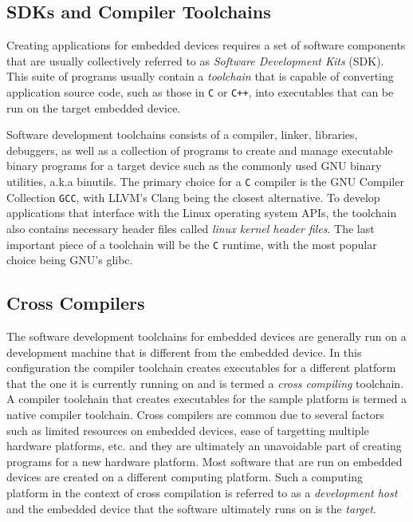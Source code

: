 
\subsection{SDKs and Compiler Toolchains}

Creating applications for embedded devices requires a set of software components that are usually collectively referred to as \textit{Software Development Kits} (SDK). This suite of programs usually contain a \textit{toolchain} that is capable of converting application source code, such as those in \texttt{C}  or \texttt{C++}, into executables that can be run on the target embedded device.

Software development toolchains consists of a compiler, linker, libraries, debuggers, as well as a collection of programs to create and manage executable binary programs for a target device such as the commonly used GNU binary utilities, a.k.a binutils. The primary choice for a \texttt{C} compiler is the GNU Compiler Collection \texttt{GCC}, with LLVM's Clang being the closest alternative. To develop applications that interface with the Linux operating system APIs, the toolchain also contains necessary header files called \textit{linux kernel header files}. The last important piece of a toolchain will be the \texttt{C} runtime, with the most popular choice being GNU's glibc.


\subsection{Cross Compilers}

The software development toolchains for embedded devices are generally run on a development machine that is different from the embedded device. In this configuration the compiler toolchain creates executables for a different platform that the one it is currently running on and is termed a \textit{cross compiling} toolchain. A compiler toolchain that creates executables for the sample platform is termed a native compiler toolchain. Cross compilers are common due to several factors such as limited resources on embedded devices, ease of targetting multiple hardware platforms, etc. and they are ultimately an unavoidable part of creating programs for a new hardware platform. Most software that are run on embedded devices are created on a different computing platform. Such a computing platform in the context of cross compilation is referred to as a \textit{development host} and the embedded device that the software ultimately runs on is the \textit{target}.

